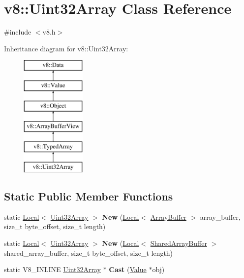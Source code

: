 \hypertarget{classv8_1_1_uint32_array}{}\section{v8\+:\+:Uint32\+Array Class Reference}
\label{classv8_1_1_uint32_array}


{\ttfamily \#include $<$v8.\+h$>$}

Inheritance diagram for v8\+:\+:Uint32\+Array\+:\begin{figure}[H]
\begin{center}
\leavevmode
\includegraphics[height=6.000000cm]{classv8_1_1_uint32_array}
\end{center}
\end{figure}
\subsection*{Static Public Member Functions}
\begin{DoxyCompactItemize}
\item 
static \hyperlink{classv8_1_1_local}{Local}$<$ \hyperlink{classv8_1_1_uint32_array}{Uint32\+Array} $>$ {\bfseries New} (\hyperlink{classv8_1_1_local}{Local}$<$ \hyperlink{classv8_1_1_array_buffer}{Array\+Buffer} $>$ array\+\_\+buffer, size\+\_\+t byte\+\_\+offset, size\+\_\+t length)\hypertarget{classv8_1_1_uint32_array_ab8dbef5ff846fc6cc9381bc29f744b5b}{}\label{classv8_1_1_uint32_array_ab8dbef5ff846fc6cc9381bc29f744b5b}

\item 
static \hyperlink{classv8_1_1_local}{Local}$<$ \hyperlink{classv8_1_1_uint32_array}{Uint32\+Array} $>$ {\bfseries New} (\hyperlink{classv8_1_1_local}{Local}$<$ \hyperlink{classv8_1_1_shared_array_buffer}{Shared\+Array\+Buffer} $>$ shared\+\_\+array\+\_\+buffer, size\+\_\+t byte\+\_\+offset, size\+\_\+t length)\hypertarget{classv8_1_1_uint32_array_a03da1a9371316818a926d2b8231ac33a}{}\label{classv8_1_1_uint32_array_a03da1a9371316818a926d2b8231ac33a}

\item 
static V8\+\_\+\+I\+N\+L\+I\+NE \hyperlink{classv8_1_1_uint32_array}{Uint32\+Array} $\ast$ {\bfseries Cast} (\hyperlink{classv8_1_1_value}{Value} $\ast$obj)\hypertarget{classv8_1_1_uint32_array_ad40e645ee0abac443dba759ee861de49}{}\label{classv8_1_1_uint32_array_ad40e645ee0abac443dba759ee861de49}

\end{DoxyCompactItemize}
